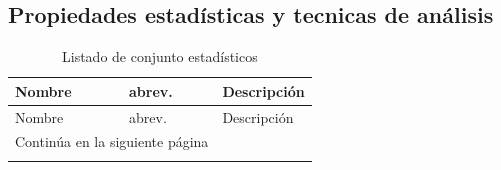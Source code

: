 \subsection{Propiedades estadísticas y tecnicas de análisis}

\begin{longtable}{|m{7em}|m{5em}|m{20em}|}
    \caption{Listado de conjunto estadísticos} 
    \label{tab-stats} \\
    \hline
    \rowcolor[gray]{0.8}
    Nombre & abrev. & Descripción \\
    \hline
    \endfirsthead
    
    \hline
    \rowcolor[gray]{0.8}
    Nombre & abrev. & Descripción \\
    \hline
    \endhead
    
    \hline \multicolumn{2}{|r|}{{Continúa en la siguiente página}} \\ \hline
    \endfoot
    

\end{longtable}
